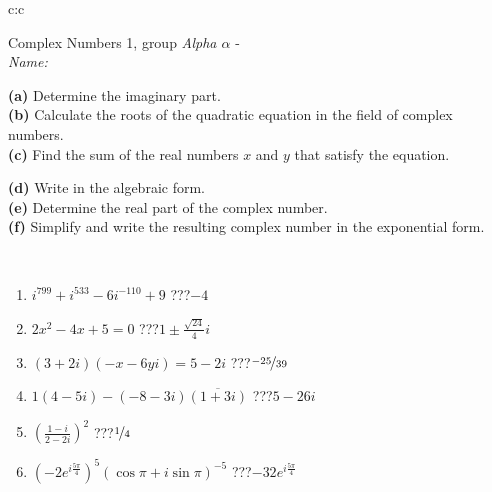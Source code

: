 \documentclass[10pt]{report}
\begin{document}
\begin{tabular}{c:c}
\begin{minipage}[c][104.5mm][t]{0.5\linewidth}
\begin{center}
\vspace{5mm}
{\huge Complex Numbers 1, group \textit{Alpha $\alpha$} -}\\[5mm]
\textit{Name:}\phantom{xxxxxxxxxxxxxxxxxxxxxxxxxxxxxxxxxxxxxxxxxxxxxxxxxxxxxxxxxxxxxxxxx}\\[5mm]
\begin{minipage}{0.95\linewidth}
\begin{center}
{\small \begin{minipage}{0.44\textwidth} \raggedright
\textbf{(a)} Determine the imaginary part. \\[1mm]
\textbf{(b)} Calculate the roots of the quadratic equation in the field of complex numbers. \\[1mm]
\textbf{(c)} Find the sum of the real numbers \(x\) and \(y\) that satisfy the equation. \end{minipage} \begin{minipage}{0.54\textwidth}
\textbf{(d)} Write in the algebraic form. \\[1mm]
\textbf{(e)} Determine the real part of the complex number. \\[1mm]
\textbf{(f)} Simplify and write the resulting complex number in the exponential form.
\end{minipage}
} \vspace{3mm}
\end{center}
\end{minipage}
\\[1mm]
\begin{minipage}{0.79\linewidth}
\begin{center}
\begin{varwidth}{\linewidth}
\setlength{\itemsep}{0pt}
\begin{enumerate}
\large
\item $i^{799}+i^{533}-6i^{-110}+9$\quad \dotfill\; ???\;\dotfill \quad $-4$
\item $2x^2-4x+5=0$\quad \dotfill\; ???\;\dotfill \quad $1 \pm{}\frac{ \sqrt{24}}{4}i$
\item $(3+2i)(-x-6yi)=5-2i$\quad \dotfill\; ???\;\dotfill \quad $\nicefrac{-25}{39}$
\item $1(4-5i)-(-8-3i)\overline{(1+3i)}$\quad \dotfill\; ???\;\dotfill \quad $5-26i$
\item $\left(\frac{1-i}{2-2i}\right)^2$\quad \dotfill\; ???\;\dotfill \quad $\nicefrac{1}{4}$
\item $\left(-2e^{i\frac{5\pi}{4}}\right)^{5}\left(\cos{\pi}+i\sin{\pi}\right)^{-5}$\quad \dotfill\; ???\;\dotfill \quad $-32e^{i\frac{5\pi}{4}}$

\end{enumerate}
\end{varwidth}
\end{center}
\end{minipage}
\end{center}
\end{minipage}
\end{tabular}
\end{document}
